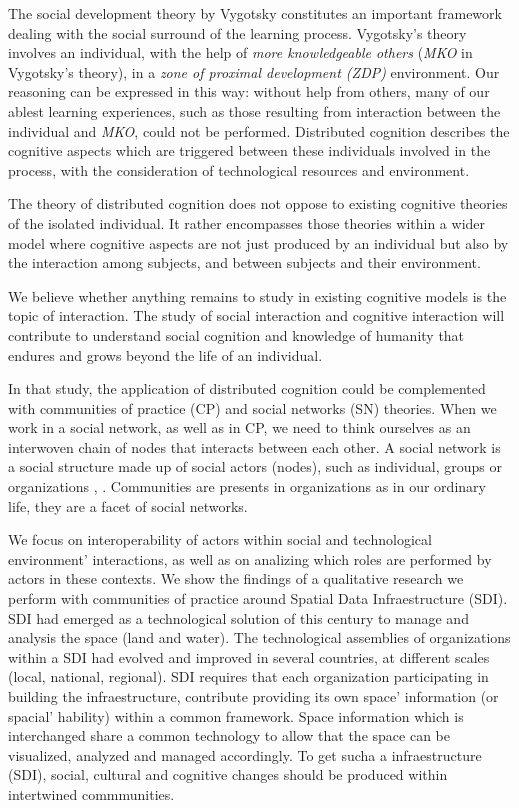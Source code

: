 \documentclass[10pt,twocolumn,ieeetran]{article}
\begin{document}
The social development theory by Vygotsky \cite{Wertsch} constitutes an important framework 
dealing with the social surround of the learning process. Vygotsky's theory involves an individual, with the help of \emph{more knowledgeable others} (\emph{MKO} in Vygotsky's theory), in a \emph{zone of proximal development (ZDP)} environment. Our reasoning can be expressed in this way: without help from others, many of our ablest learning experiences, such as those resulting from interaction between the individual and \emph{MKO},  could not be performed. Distributed cognition describes the cognitive aspects which are triggered between these individuals involved in the process, with the consideration of technological resources and environment.

The theory of distributed cognition \cite{Salomon} does not oppose to existing cognitive theories of the isolated individual. It rather encompasses those theories within a wider model where cognitive aspects are not just produced by an individual but also by the interaction among subjects, and between subjects and their environment.

We believe whether anything remains to study in existing cognitive models is the topic of interaction. The study of social interaction and cognitive interaction will contribute to understand social cognition and knowledge of humanity \cite{Denny} that endures and grows beyond the life of an individual.

In that study, the application of distributed cognition could be complemented with communities of practice (CP) \cite{Wenger} and social networks (SN) \cite{Kadushin} \cite{Santos}\cite{Watts} theories. When we work in a social network, as well as in CP, we need to think ourselves as an interwoven chain of nodes that interacts between each other. A social network is a social structure made up of social actors (nodes), such as individual, groups or organizations \cite{Wasserman}, \cite{Jamali}. Communities are presents in organizations as in our ordinary life, they are a facet of social networks.

We focus on interoperability of actors within social and technological environment' interactions, as well as on analizing which roles are performed by actors in these contexts. We show the findings of a qualitative 
research we perform with communities of practice around Spatial Data Infraestructure (SDI). SDI had emerged
as a technological solution of this century to manage and analysis the space (land and water). The technological assemblies of organizations within a SDI had evolved and improved in several countries, at
different scales (local, national, regional). SDI requires that each organization participating in building the infraestructure, contribute providing its own space' information (or spacial' hability) within a common framework. Space information which is interchanged share a common technology to allow that the space can be visualized, analyzed and managed accordingly. To get sucha a infraestructure (SDI), social, cultural \cite{Nisbett} and cognitive changes should be produced within intertwined commmunities.
\end{document}
